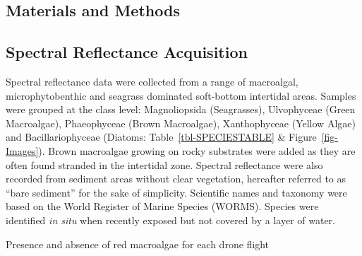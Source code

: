 \documentclass[
  letterpaper,
  11pt,
  english,
  singlespacing,
  headsepline]{MastersDoctoralThesis}
\begin{document}
\begin{spacing}{1.5}
\section{Materials and Methods}\label{materials-and-methods}

\subsection{Spectral Reflectance
Acquisition}\label{spectral-reflectance-acquisition}

Spectral reflectance data were collected from a range of macroalgal,
microphytobenthic and seagrass dominated soft-bottom intertidal areas.
Samples were grouped at the class level: Magnoliopsida (Seagrasses),
Ulvophyceae (Green Macroalgae), Phaeophyceae (Brown Macroalgae),
Xanthophyceae (Yellow Algae) and Bacillariophyceae (Diatoms:
Table~\ref{tbl-SPECIESTABLE} \& Figure~\ref{fig-Images}). Brown
macroalgae growing on rocky substrates were added as they are often
found stranded in the intertidal zone. Spectral reflectance were also
recorded from sediment areas without clear vegetation, hereafter
referred to as ``bare sediment'' for the sake of simplicity. Scientific
names and taxonomy were based on the World Register of Marine Species
(WORMS). Species were identified \emph{in situ} when recently exposed
but not covered by a layer of water.

\begin{table}

\caption{\label{tbl-SPECIESTABLE}Presence and absence of red macroalgae
for each drone flight}

\end{table}
\end{spacing}
\end{document}
